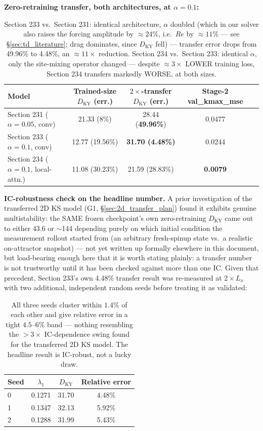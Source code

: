 \documentclass[11pt]{article}
\begin{document}
\textbf{Zero-retraining transfer, both architectures, at $\alpha=0.1$:}

\begin{table}[h]
\centering
\begin{tabular}{lcccc}
\toprule
Model & Trained-size $D_{\mathrm{KY}}$ (err.) & $2\times$-transfer $D_{\mathrm{KY}}$ (err.) & Stage-2 val\_kmax\_mse \\
\midrule
Section 231 ($\alpha{=}0.05$, conv) & 21.33 (8\%) & 28.44 (\textbf{49.96\%}) & 0.0477 \\
Section 233 ($\alpha{=}0.1$, conv)  & 12.77 (19.56\%) & \textbf{31.70 (4.48\%)} & 0.0244 \\
Section 234 ($\alpha{=}0.1$, local-attn.) & 11.08 (30.23\%) & 21.59 (28.83\%) & \textbf{0.0079} \\
\bottomrule
\end{tabular}
\caption{Section 233 vs.\ Section 231: identical architecture, $\alpha$
doubled (which in our solver also raises the forcing amplitude by
$\approx24\%$, i.e.\ $Re$ by $\approx11\%$ --- see
\S\ref{sec:td_literature}; drag dominates, since $D_{\mathrm{KY}}$ fell) ---
transfer error drops from 49.96\% to 4.48\%, an
$\approx11\times$ reduction. Section 234 vs.\ Section 233: identical
$\alpha$, only the site-mixing operator changed --- despite $\approx3\times$
LOWER training loss, Section 234 transfers markedly WORSE, at both
sizes.}
\label{tab:g2_transfer}
\end{table}

\textbf{IC-robustness check on the headline number.} A prior investigation
of the transferred 2D KS model (G1, \S\ref{sec:2d_transfer_plan}) found
it exhibits genuine multistability: the SAME frozen checkpoint's own
zero-retraining $D_{\mathrm{KY}}$ came out to either 43.6 or
$\sim$144 depending purely on which initial condition the measurement
rollout started from (an arbitrary fresh-spinup state vs.\ a realistic
on-attractor snapshot) --- not yet written up formally elsewhere in this
document, but load-bearing enough here that it is worth stating plainly:
a transfer number is not trustworthy until it has been checked against
more than one IC. Given that precedent, Section 233's own 4.48\%
transfer result was re-measured at $2\times L_x$ with two additional,
independent random seeds before treating it as validated:

\begin{table}[h]
\centering
\begin{tabular}{lccc}
\toprule
Seed & $\lambda_1$ & $D_{\mathrm{KY}}$ & Relative error \\
\midrule
0 & 0.1271 & 31.70 & 4.48\% \\
1 & 0.1347 & 32.13 & 5.92\% \\
2 & 0.1288 & 31.99 & 5.43\% \\
\bottomrule
\end{tabular}
\caption{All three seeds cluster within $1.4\%$ of each other and give
relative error in a tight $4.5$--$6\%$ band --- nothing resembling the
$>3\times$ IC-dependence swing found for the transferred 2D KS model.
The headline result is IC-robust, not a lucky draw.}
\label{tab:g2_ic_robustness}
\end{table}
\end{document}
